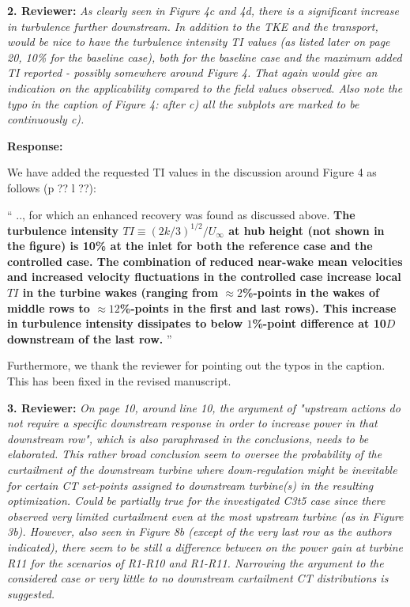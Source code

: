 \documentclass[]{article}
\begin{document}
\dotfill

\textbf{2. Reviewer: } \textit{As clearly seen in Figure 4c and 4d, there is a significant increase in turbulence
	further downstream. In addition to the TKE and the transport, would be nice to have the
	turbulence intensity TI values (as listed later on page 20, 10\% for the baseline case),
	both for the baseline case and the maximum added TI reported - possibly somewhere
	around Figure 4. That again would give an indication on the applicability compared to
	the field values observed. Also note the typo in the caption of Figure 4: after c) all the
	subplots are marked to be continuously c).}

\textbf{Response: }

We have added the requested TI values in the discussion around Figure 4 as follows (p ?? l ??):

``
.., for which an enhanced recovery was found as discussed above. \textbf{The turbulence intensity $TI \equiv (2k/3  )^{1/2}/U_\infty$ at hub height (not shown in the figure) is 10\% at the inlet for both the reference case and the controlled case. The combination of reduced near-wake mean velocities and increased velocity fluctuations in the controlled case increase local $TI$ in the turbine wakes (ranging from $\approx 2$\%-points in the wakes of middle rows to $\approx 12$\%-points in the first and last rows). This increase in turbulence intensity dissipates to below $1$\%-point difference at 10$D$ downstream of the last row.}
''

Furthermore, we thank the reviewer for pointing out the typos in the caption. This has been fixed in the revised manuscript.

\dotfill

\textbf{3. Reviewer: } \textit{On page 10, around line 10, the argument of "upstream actions do not require a
	specific downstream response in order to increase power in that downstream row",
	which is also paraphrased in the conclusions, needs to be elaborated. This rather
	broad conclusion seem to oversee the probability of the curtailment of the downstream
	turbine where down-regulation might be inevitable for certain CT set-points assigned
	to downstream turbine(s) in the resulting optimization. Could be partially true for the
	investigated C3t5 case since there observed very limited curtailment even at the most
	upstream turbine (as in Figure 3b). However, also seen in Figure 8b (except of the
	very last row as the authors indicated), there seem to be still a difference between on
	the power gain at turbine R11 for the scenarios of R1-R10 and R1-R11. Narrowing the argument to the considered case or very little to no downstream curtailment CT
	distributions is suggested.}
\end{document}
